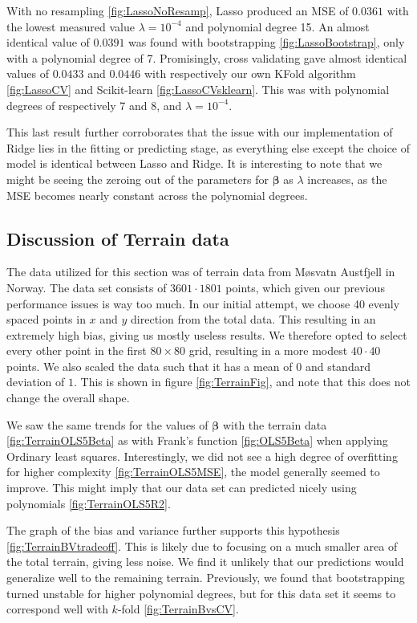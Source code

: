 \documentclass{article}
\begin{document}
With no resampling \ref{fig:LassoNoResamp}, Lasso produced an MSE of $0.0361$ with the lowest measured value $\lambda = 10^{-4}$ and polynomial degree 15. An almost identical value of $0.0391$ was found with bootstrapping \ref{fig:LassoBootstrap}, only with a polynomial degree of 7. Promisingly, cross validating gave almost identical values of $0.0433$ and $0.0446$ with respectively our own KFold algorithm \ref{fig:LassoCV} and Scikit-learn \ref{fig:LassoCVsklearn}. This was with polynomial degrees of respectively 7 and 8, and $\lambda = 10^{-4}$.

This last result further corroborates that the issue with our implementation of Ridge lies in the fitting or predicting stage, as everything else except the choice of model is identical between Lasso and Ridge. It is interesting to note that we might be seeing the zeroing out of the parameters for $\boldsymbol{\beta}$ as $\lambda$ increases, as the MSE becomes nearly constant across the polynomial degrees.

\subsection{Discussion of Terrain data}
The data utilized for this section was of terrain data from Møsvatn Austfjell in Norway. The data set consists of $3601 \cdot 1801$ points, which given our previous performance issues is way too much. In our initial attempt, we choose 40 evenly spaced points in $x$ and $y$ direction from the total data. This resulting in an extremely high bias, giving us mostly useless results. We therefore opted to select every other point in the first $80 \times 80$ grid, resulting in a more modest $40 \cdot 40$ points. We also scaled the data such that it has a mean of $0$ and standard deviation of $1$. This is shown in figure \ref{fig:TerrainFig}, and note that this does not change the overall shape.

We saw the same trends for the values of $\boldsymbol{\beta}$ with the terrain data \ref{fig:TerrainOLS5Beta} as with Frank's function \ref{fig:OLS5Beta} when applying Ordinary least squares. Interestingly, we did not see a high degree of overfitting for higher complexity \ref{fig:TerrainOLS5MSE}, the model generally seemed to improve. This might imply that our data set can predicted nicely using polynomials \ref{fig:TerrainOLS5R2}.

The graph of the bias and variance further supports this hypothesis \ref{fig:TerrainBVtradeoff}. This is likely due to focusing on a much smaller area of the total terrain, giving less noise. We find it unlikely that our predictions would generalize well to the remaining terrain. Previously, we found that bootstrapping turned unstable for higher polynomial degrees, but for this data set it seems to correspond well with $k$-fold \ref{fig:TerrainBvsCV}.
\end{document}
